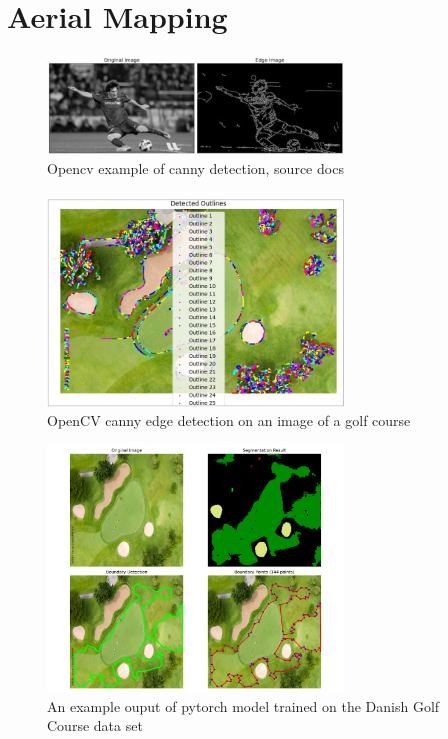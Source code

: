 \documentclass[final]{cmpreport_02}
\begin{document}
\section{Aerial Mapping}

\begin{figure}[h!]
	\centering
	\includegraphics[width=0.7\textwidth]{./images/openCvCannyExample.jpg}
	\caption{Opencv example of canny detection, source \citep{opencv_library} docs}
	\label{am:cannyexample}
\end{figure}


\begin{figure}[h!]
	\centering
	\includegraphics[width=0.7\textwidth]{./images/openCvCannyGolfCourse.png}
	\caption{OpenCV canny edge detection on an image of a golf course}
	\label{am:CannyGolfCourse}
\end{figure}

\begin{figure}[h!]
	\centering
	\includegraphics[width=0.7\textwidth]{./images/AdobeGolf_visualisation.png}
	\caption{An example ouput of pytorch model trained on the Danish Golf Course data set}
	\label{am:AGDanish}
\end{figure}
\end{document}
